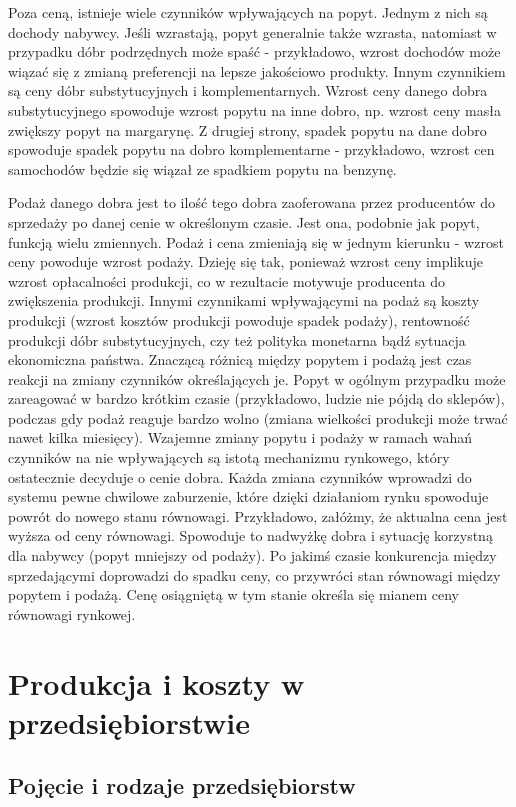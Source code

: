 \documentclass[12pt]{extarticle}
\begin{document}
Poza ceną, istnieje wiele czynników wpływających na popyt. Jednym z nich są dochody nabywcy. Jeśli wzrastają, popyt generalnie także wzrasta, natomiast w przypadku dóbr podrzędnych może spaść - przykładowo, wzrost dochodów może wiązać się z zmianą preferencji na lepsze jakościowo produkty. Innym czynnikiem są ceny dóbr substytucyjnych i komplementarnych. Wzrost ceny danego dobra substytucyjnego spowoduje wzrost popytu na inne dobro, np. wzrost ceny masła zwiększy popyt na margarynę. Z drugiej strony, spadek popytu na dane dobro spowoduje spadek popytu na dobro komplementarne - przykładowo, wzrost cen samochodów będzie się wiązał ze spadkiem popytu na benzynę.


Podaż danego dobra jest to ilość tego dobra zaoferowana przez producentów do sprzedaży po danej cenie w określonym czasie. Jest ona, podobnie jak popyt, funkcją wielu zmiennych. Podaż i cena zmieniają się w jednym kierunku - wzrost ceny powoduje wzrost podaży. Dzieję się tak, ponieważ wzrost ceny implikuje wzrost opłacalności produkcji, co w rezultacie motywuje producenta do zwiększenia produkcji. Innymi czynnikami wpływającymi na podaż są koszty produkcji (wzrost kosztów produkcji powoduje spadek podaży), rentowność produkcji dóbr substytucyjnych, czy też polityka monetarna bądź sytuacja ekonomiczna państwa. Znaczącą różnicą między popytem i podażą jest czas reakcji na zmiany czynników określających je. Popyt w ogólnym przypadku może zareagować w bardzo krótkim czasie (przykładowo, ludzie nie pójdą do sklepów), podczas gdy podaż reaguje bardzo wolno (zmiana wielkości produkcji może trwać nawet kilka miesięcy).
Wzajemne zmiany popytu i podaży w ramach wahań czynników na nie wpływających są istotą mechanizmu rynkowego, który ostatecznie decyduje o cenie dobra. Każda zmiana czynników wprowadzi do systemu pewne chwilowe zaburzenie, które dzięki działaniom rynku spowoduje powrót do nowego stanu równowagi. Przykładowo, załóżmy, że aktualna cena jest wyższa od ceny równowagi. Spowoduje to nadwyżkę dobra i sytuację korzystną dla nabywcy (popyt mniejszy od podaży). Po jakimś czasie konkurencja między sprzedającymi doprowadzi do spadku ceny, co przywróci stan równowagi między popytem i podażą. Cenę osiągniętą w tym stanie określa się mianem ceny równowagi rynkowej.


\section{Produkcja i koszty w przedsiębiorstwie}

\subsection{Pojęcie i rodzaje przedsiębiorstw}
\end{document}
